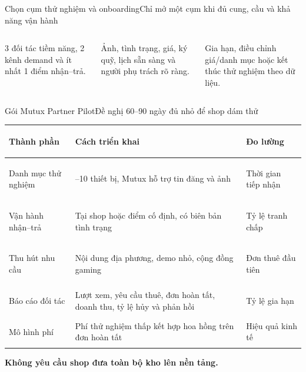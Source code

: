 \begin{frame}{Chọn cụm thử nghiệm và onboarding}{Chỉ mở một cụm khi đủ cung, cầu và khả năng vận hành}
  \vspace{.7em}
  \centering
  \vfill
  \begin{columns}[T,onlytextwidth]
      \par\vspace{.35em}
      3 đối tác tiềm năng, 2 kênh demand và ít nhất 1 điểm nhận--trả.
      \par\vspace{.35em}
      Ảnh, tình trạng, giá, ký quỹ, lịch sẵn sàng và người phụ trách rõ ràng.
      \par\vspace{.35em}
      Gia hạn, điều chỉnh giá/danh mục hoặc kết thúc thử nghiệm theo dữ liệu.
  \end{columns}
\end{frame}

\begin{frame}{Gói Mutux Partner Pilot}{Đề nghị 60--90 ngày đủ nhỏ để shop dám thử}
  \vspace{.8em}
  \centering\small
  \begin{tabularx}{.94\textwidth}{@{}>{\bfseries\raggedright\arraybackslash}p{}>{\raggedright\arraybackslash}X>{\raggedright\arraybackslash}p{}@{}}
    \toprule
    Thành phần & Cách triển khai & Đo lường \\
    \midrule
    Danh mục thử nghiệm & 3--10 thiết bị, Mutux hỗ trợ tin đăng và ảnh & Thời gian tiếp nhận \\
    Vận hành nhận--trả & Tại shop hoặc điểm cố định, có biên bản tình trạng & Tỷ lệ tranh chấp \\
    Thu hút nhu cầu & Nội dung địa phương, demo nhỏ, cộng đồng gaming & Đơn thuê đầu tiên \\
    Báo cáo đối tác & Lượt xem, yêu cầu thuê, đơn hoàn tất, doanh thu, tỷ lệ hủy và phản hồi & Tỷ lệ gia hạn \\
    Mô hình phí & Phí thử nghiệm thấp kết hợp hoa hồng trên đơn hoàn tất & Hiệu quả kinh tế \\
    \bottomrule
  \end{tabularx}
  \vfill
  \centering\textcolor{mutuxOrange}{\textbf{Không yêu cầu shop đưa toàn bộ kho lên nền tảng.}}
\end{frame}


